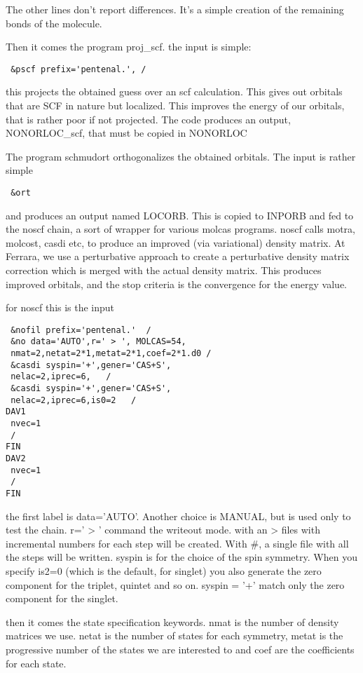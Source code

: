 \documentclass[11pt,a4paper]{article}
\begin{document}
The other lines don't report differences. It's a simple creation of the
remaining bonds of the molecule.

Then it comes the program proj\_scf. the input is simple:

\begin{verbatim}
 &pscf prefix='pentenal.', /
\end{verbatim}

this projects the obtained guess over an scf calculation. This gives out
orbitals that are SCF in nature but localized. This improves the energy of our
orbitals, that is rather poor if not projected.  The code produces an output,
NONORLOC\_scf, that must be copied in NONORLOC

The program schmudort orthogonalizes the obtained orbitals. The input is rather
simple

\begin{verbatim}
 &ort
\end{verbatim}

and produces an output named LOCORB. This is copied to INPORB and fed to the
noscf chain, a sort of wrapper for various molcas programs. noscf calls motra,
molcost, casdi etc, to produce an improved (via variational) density matrix. At
Ferrara, we use a perturbative approach to create a perturbative density matrix
correction which is merged with the actual density matrix. This produces
improved orbitals, and the stop criteria is the convergence for the energy
value.

for noscf this is the input

\begin{verbatim}
 &nofil prefix='pentenal.'  /
 &no data='AUTO',r=' > ', MOLCAS=54,
 nmat=2,netat=2*1,metat=2*1,coef=2*1.d0 /
 &casdi syspin='+',gener='CAS+S',
 nelac=2,iprec=6,   /
 &casdi syspin='+',gener='CAS+S',
 nelac=2,iprec=6,is0=2   /
DAV1
 nvec=1
 / 
FIN
DAV2
 nvec=1
 /
FIN
\end{verbatim}


the first label is data='AUTO'. Another choice is MANUAL, but is used only to
test the chain.  r=' > ' command the writeout mode. with an > files with
incremental numbers for each step will be created. With \#, a single file with
all the steps will be written.
syspin is for the choice of the spin symmetry. When you specify is2=0 (which
is the default, for singlet) you also generate the zero component for the
triplet, quintet and so on. syspin = '+' match only the zero component for
the singlet.

then it comes the state specification keywords. nmat is the number of density
matrices we use.  netat is the number of states for each symmetry, metat is the
progressive number of the states we are interested to and coef are the
coefficients for each state.
\end{document}
